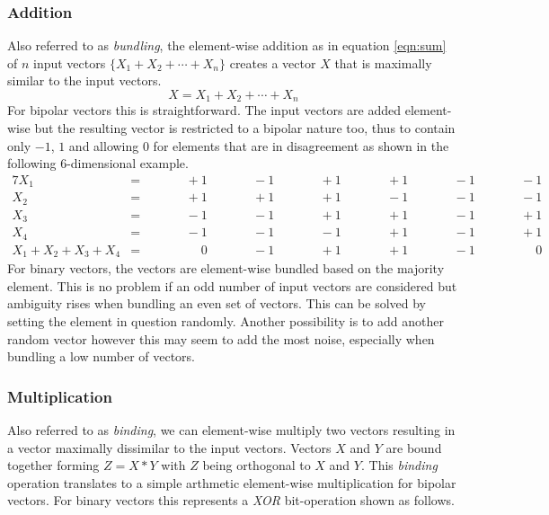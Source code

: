 \subsubsection*{Addition}
Also referred to as \textit{bundling}, the element-wise addition as in equation \ref{eqn:sum} of $n$ input vectors $\{X_{1} + X_{2} + \cdots + X_{n}\}$ creates a vector $X$ that is maximally similar to the input vectors.
\begin{equation}
    \label{eqn:sum}
    X = X_{1} + X_{2} + \cdots + X_{n}
\end{equation}
For bipolar vectors this is straightforward. The input vectors are added element-wise but the resulting vector is restricted to a bipolar nature too, thus to contain only $-1$, $1$ and allowing $0$ for elements that are in disagreement as shown in the following $6$-dimensional example.
\begin{alignat*}{7}
    X_{1} &= && \qquad +1 && \qquad -1 && \qquad +1 && \qquad +1 && \qquad -1 && \qquad -1 \\
    X_{2} &= && \qquad +1 && \qquad +1 && \qquad +1 && \qquad -1 && \qquad -1 && \qquad -1 \\
    X_{3} &= && \qquad -1 && \qquad -1 && \qquad +1 && \qquad +1 && \qquad -1 && \qquad +1 \\
    X_{4} &= && \qquad -1 && \qquad -1 && \qquad -1 && \qquad +1 && \qquad -1 && \qquad +1 \\
    \hline
    X_{1} + X_{2} + X_{3} + X_{4} &= && \qquad \phantom{-}0 && \qquad -1 && \qquad +1 && \qquad +1 && \qquad -1 && \qquad \phantom{-}0
\end{alignat*}
For binary vectors, the vectors are element-wise bundled based on the majority element. This is no problem if an odd number of input vectors are considered but ambiguity rises when bundling an even set of vectors. This can be solved by setting the element in question randomly. \cite{binBund} Another possibility is to add another random vector however this may seem to add the most noise, especially when bundling a low number of vectors.
\subsubsection*{Multiplication}
Also referred to as \textit{binding}, we can element-wise multiply two vectors resulting in a vector maximally dissimilar to the input vectors. Vectors $X$ and $Y$ are bound together forming $Z = X * Y$ with $Z$ being orthogonal to $X$ and $Y$. This \textit{binding} operation translates to a simple arthmetic element-wise multiplication for bipolar vectors. For binary vectors this represents a \textit{XOR} bit-operation shown as follows.